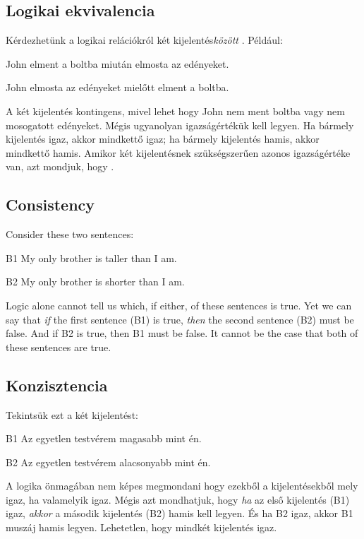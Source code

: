 \subsection{Logikai ekvivalencia}
Kérdezhetünk a logikai relációkról két kijelentés\emph{között} . Például:
\begin{earg}
\item[] John elment a boltba miután elmosta az edényeket.
\item[] John elmosta az edényeket mielőtt elment a boltba.
\end{earg}
A két kijelentés kontingens, mivel lehet hogy John nem ment boltba vagy nem mosogatott edényeket. Mégis ugyanolyan igazságértékük kell legyen. Ha bármely kijelentés igaz, akkor mindkettő igaz; ha bármely kijelentés hamis, akkor mindkettő hamis. Amikor két kijelentésnek szükségszerűen azonos igazságértéke van, azt mondjuk, hogy .

\subsection{Consistency}
Consider these two sentences:
\begin{ekey}
\item[B1] My only brother is taller than I am.
\item[B2] My only brother is shorter than I am.
\end{ekey}
Logic alone cannot tell us which, if either, of these sentences is true. Yet we can say that \emph{if} the first sentence (B1) is true, \emph{then} the second sentence (B2) must be false. And if B2 is true, then B1 must be false. It cannot be the case that both of these sentences are true.

\subsection{Konzisztencia}
Tekintsük ezt a két kijelentést:
\begin{ekey}
\item[B1] Az egyetlen testvérem magasabb mint én.
\item[B2] Az egyetlen testvérem alacsonyabb mint én.
\end{ekey}
A logika önmagában nem képes megmondani hogy ezekből a kijelentésekből mely igaz, ha valamelyik igaz. Mégis azt mondhatjuk, hogy \emph{ha} az első kijelentés (B1) igaz, \emph{akkor} a második kijelentés (B2) hamis kell legyen. És ha B2 igaz, akkor B1 muszáj hamis legyen. Lehetetlen, hogy mindkét kijelentés igaz.

